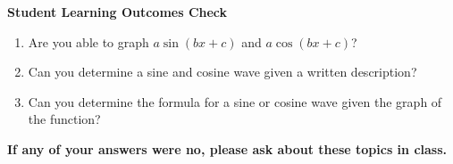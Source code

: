 \newpage
\noindent \textbf{Student Learning Outcomes Check}

\begin{enumerate}
\item Are you able to graph $a\sin(bx+c)$ and $a\cos(bx+c)$?
\item Can you determine a sine and cosine wave given a written description?
\item Can you determine the formula for a sine or cosine wave given the graph of the function?

\end{enumerate}

\noindent \textbf{If any of your answers were no, please ask about these topics in class.}

